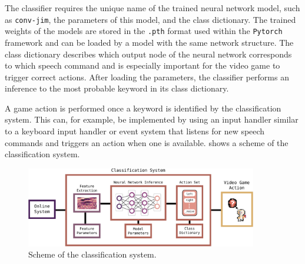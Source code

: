 The classifier requires the unique name of the trained neural network model, such as \texttt{conv-jim}, the parameters of this model, and the class dictionary.
The trained weights of the  models are stored in the \texttt{.pth} format used within the \texttt{Pytorch} framework and can be loaded by a model with the same network structure.
The class dictionary describes which output node of the neural network corresponds to which speech command and is especially important for the video game to trigger correct actions.
After loading the parameters, the classifier performs an inference to the most probable keyword in its class dictionary.

A game action is performed once a keyword is identified by the classification system.
This can, for example, be implemented by using an input handler similar to a keyboard input handler or event system that listens for new speech commands and triggers an action when one is available.
 shows a scheme of the classification system.
\begin{figure}[!ht]
  \centering
  \includegraphics[width=0.9\textwidth]{./6_game/figs/game_system_classification.pdf}
  \caption{Scheme of the classification system.}
  \label{fig:game_system_classification}
\end{figure}
\FloatBarrier
\noindent

